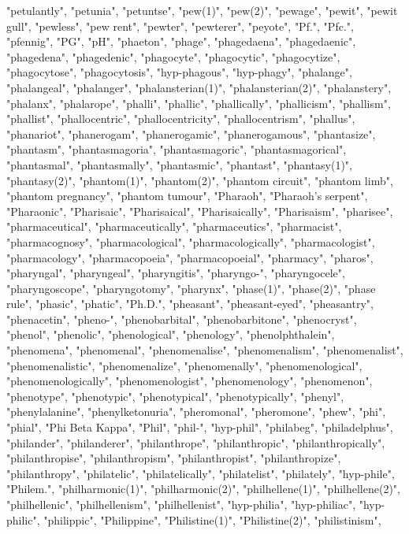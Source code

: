"petulantly",
"petunia",
"petuntse",
"pew(1)",
"pew(2)",
"pewage",
"pewit",
"pewit gull",
"pewless",
"pew rent",
"pewter",
"pewterer",
"peyote",
"Pf.",
"Pfc.",
"pfennig",
"PG",
"pH",
"phaeton",
"phage",
"phagedaena",
"phagedaenic",
"phagedena",
"phagedenic",
"phagocyte",
"phagocytic",
"phagocytize",
"phagocytose",
"phagocytosis",
"hyp-phagous",
"hyp-phagy",
"phalange",
"phalangeal",
"phalanger",
"phalansterian(1)",
"phalansterian(2)",
"phalanstery",
"phalanx",
"phalarope",
"phalli",
"phallic",
"phallically",
"phallicism",
"phallism",
"phallist",
"phallocentric",
"phallocentricity",
"phallocentrism",
"phallus",
"phanariot",
"phanerogam",
"phanerogamic",
"phanerogamous",
"phantasize",
"phantasm",
"phantasmagoria",
"phantasmagoric",
"phantasmagorical",
"phantasmal",
"phantasmally",
"phantasmic",
"phantast",
"phantasy(1)",
"phantasy(2)",
"phantom(1)",
"phantom(2)",
"phantom circuit",
"phantom limb",
"phantom pregnancy",
"phantom tumour",
"Pharaoh",
"Pharaoh's serpent",
"Pharaonic",
"Pharisaic",
"Pharisaical",
"Pharisaically",
"Pharisaism",
"pharisee",
"pharmaceutical",
"pharmaceutically",
"pharmaceutics",
"pharmacist",
"pharmacognosy",
"pharmacological",
"pharmacologically",
"pharmacologist",
"pharmacology",
"pharmacopoeia",
"pharmacopoeial",
"pharmacy",
"pharos",
"pharyngal",
"pharyngeal",
"pharyngitis",
"pharyngo-",
"pharyngocele",
"pharyngoscope",
"pharyngotomy",
"pharynx",
"phase(1)",
"phase(2)",
"phase rule",
"phasic",
"phatic",
"Ph.D.",
"pheasant",
"pheasant-eyed",
"pheasantry",
"phenacetin",
"pheno-",
"phenobarbital",
"phenobarbitone",
"phenocryst",
"phenol",
"phenolic",
"phenological",
"phenology",
"phenolphthalein",
"phenomena",
"phenomenal",
"phenomenalise",
"phenomenalism",
"phenomenalist",
"phenomenalistic",
"phenomenalize",
"phenomenally",
"phenomenological",
"phenomenologically",
"phenomenologist",
"phenomenology",
"phenomenon",
"phenotype",
"phenotypic",
"phenotypical",
"phenotypically",
"phenyl",
"phenylalanine",
"phenylketonuria",
"pheromonal",
"pheromone",
"phew",
"phi",
"phial",
"Phi Beta Kappa",
"Phil",
"phil-",
"hyp-phil",
"philabeg",
"philadelphus",
"philander",
"philanderer",
"philanthrope",
"philanthropic",
"philanthropically",
"philanthropise",
"philanthropism",
"philanthropist",
"philanthropize",
"philanthropy",
"philatelic",
"philatelically",
"philatelist",
"philately",
"hyp-phile",
"Philem.",
"philharmonic(1)",
"philharmonic(2)",
"philhellene(1)",
"philhellene(2)",
"philhellenic",
"philhellenism",
"philhellenist",
"hyp-philia",
"hyp-philiac",
"hyp-philic",
"philippic",
"Philippine",
"Philistine(1)",
"Philistine(2)",
"philistinism",
